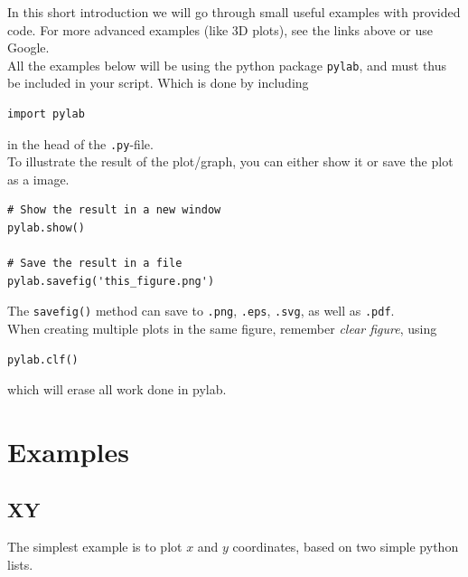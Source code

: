 \documentclass{article}
\newcommand{\code}[1]{\texttt{#1}} %
\begin{document}
In this short introduction we will go through small useful examples with
provided code. For more advanced examples (like 3D plots), see the links above
or use Google.\\

All the examples below will be using the python package \code{pylab}, and
must thus be included in your script. Which is done by including

\begin{lstlisting}
import pylab
\end{lstlisting}

in the head of the \code{.py}-file.\\

To illustrate the result of the plot/graph, you can either show it or save the
plot as a image.

\begin{lstlisting}
# Show the result in a new window
pylab.show()

# Save the result in a file
pylab.savefig('this_figure.png')
\end{lstlisting}


The \code{savefig()} method can save to
\code{.png},
\code{.eps},
\code{.svg},
as well as
\code{.pdf}.\\

When creating multiple plots in the same figure, remember {\em clear figure},
using

\begin{lstlisting}
pylab.clf()
\end{lstlisting}

which will erase all work done in pylab.



\newpage
\section{Examples}

\subsection{XY}

The simplest example is to plot $x$ and $y$ coordinates,
based on two simple python lists.
\end{document}
